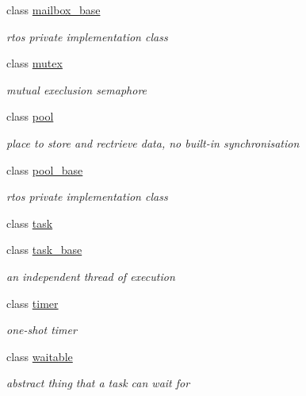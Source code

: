 \begin{DoxyCompactItemize}
class \hyperlink{classrtos_1_1mailbox__base}{mailbox\+\_\+base}
\begin{DoxyCompactList}\small\item\em rtos private implementation class \end{DoxyCompactList}\item 
class \hyperlink{classrtos_1_1mutex}{mutex}
\begin{DoxyCompactList}\small\item\em mutual execlusion semaphore \end{DoxyCompactList}\item 
class \hyperlink{classrtos_1_1pool}{pool}
\begin{DoxyCompactList}\small\item\em place to store and rectrieve data, no built-\/in synchronisation \end{DoxyCompactList}\item 
class \hyperlink{classrtos_1_1pool__base}{pool\+\_\+base}
\begin{DoxyCompactList}\small\item\em rtos private implementation class \end{DoxyCompactList}\item 
class \hyperlink{classrtos_1_1task}{task}
\item 
class \hyperlink{classrtos_1_1task__base}{task\+\_\+base}
\begin{DoxyCompactList}\small\item\em an independent thread of execution \end{DoxyCompactList}\item 
class \hyperlink{classrtos_1_1timer}{timer}
\begin{DoxyCompactList}\small\item\em one-\/shot timer \end{DoxyCompactList}\item 
class \hyperlink{classrtos_1_1waitable}{waitable}
\begin{DoxyCompactList}\small\item\em abstract thing that a task can wait for \end{DoxyCompactList}\end{DoxyCompactItemize}
